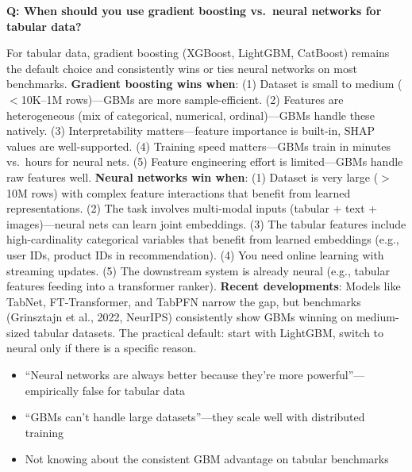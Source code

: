 \begin{interviewq}
\textbf{Q: When should you use gradient boosting vs.\ neural networks for tabular data?}

 \quad {} \quad \badgefreq{\freqhigh}

\stronganswer For tabular data, gradient boosting (XGBoost, LightGBM, CatBoost) remains the default choice and consistently wins or ties neural networks on most benchmarks. \textbf{Gradient boosting wins when}: (1) Dataset is small to medium ($<$10K--1M rows)---GBMs are more sample-efficient. (2) Features are heterogeneous (mix of categorical, numerical, ordinal)---GBMs handle these natively. (3) Interpretability matters---feature importance is built-in, SHAP values are well-supported. (4) Training speed matters---GBMs train in minutes vs.\ hours for neural nets. (5) Feature engineering effort is limited---GBMs handle raw features well. \textbf{Neural networks win when}: (1) Dataset is very large ($>$10M rows) with complex feature interactions that benefit from learned representations. (2) The task involves multi-modal inputs (tabular + text + images)---neural nets can learn joint embeddings. (3) The tabular features include high-cardinality categorical variables that benefit from learned embeddings (e.g., user IDs, product IDs in recommendation). (4) You need online learning with streaming updates. (5) The downstream system is already neural (e.g., tabular features feeding into a transformer ranker). \textbf{Recent developments}: Models like TabNet, FT-Transformer, and TabPFN narrow the gap, but benchmarks (Grinsztajn et al., 2022, NeurIPS) consistently show GBMs winning on medium-sized tabular datasets. The practical default: start with LightGBM, switch to neural only if there is a specific reason.

\redflags
\begin{itemize}
    \item ``Neural networks are always better because they're more powerful''---empirically false for tabular data
    \item ``GBMs can't handle large datasets''---they scale well with distributed training
    \item Not knowing about the consistent GBM advantage on tabular benchmarks
\end{itemize}



\end{interviewq}
